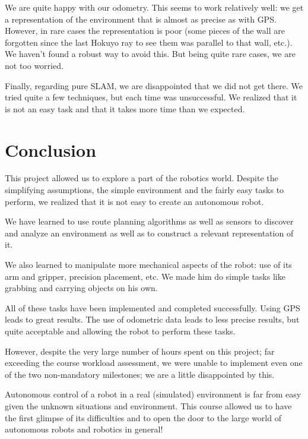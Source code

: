 \documentclass[a4paper, 10pt, conference]{ieeeconf}
\begin{document}
    We are quite happy with our odometry. This seems to work relatively well: we get a representation of the environment that is almost as precise as with GPS. However, in rare cases the representation is poor (some pieces of the wall are forgotten since the last Hokuyo ray to see them was parallel to that wall, etc.). We haven't found a robust way to avoid this. But being quite rare cases, we are not too worried.
    
    Finally, regarding pure SLAM, we are disappointed that we did not get there. We tried quite a few techniques, but each time was unsuccessful. We realized that it is not an easy task and that it takes more time than we expected.
    
    
    \section{Conclusion}
    
    This project allowed us to explore a part of the robotics world. Despite the simplifying assumptions, the simple environment and the fairly easy tasks to perform, we realized that it is not easy to create an autonomous robot.
    
    We have learned to use route planning algorithms as well as sensors to discover and analyze an environment as well as to construct a relevant representation of it.
    
    We also learned to manipulate more mechanical aspects of the robot: use of its arm and gripper, precision placement, etc. We made him do simple tasks like grabbing and carrying objects on his own.
    
    All of these tasks have been implemented and completed successfully. Using GPS leads to great results. The use of odometric data leads to less precise results, but quite acceptable and allowing the robot to perform these tasks.
    
    However, despite the very large number of hours spent on this project; far exceeding the course workload assessment, we were unable to implement even one of the two non-mandatory milestones; we are a little disappointed by this.
    
    Autonomous control of a robot in a real (simulated) environment is far from easy given the unknown situations and environment. This course allowed us to have the first glimpse of its difficulties and to open the door to the large world of autonomous robots and robotics in general!
    
\end{document}

